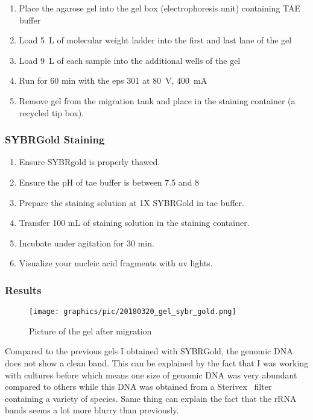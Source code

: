 \begin{enumerate}
\item Place the agarose gel into the gel box (electrophoresis unit) containing TAE buffer
\item Load 5~\textmu L of molecular weight ladder into the first and last lane of the gel
\item Load 9~\textmu L of each sample into the additional wells of the gel
\item Run for 60 min with the \gls{eps} 301 at 80~V, 400~mA
\item Remove gel from the migration tank and place in the staining container (a recycled tip box).
\end{enumerate}

\subsubsection{SYBR\cR Gold Staining}

\begin{enumerate}
\item Ensure SYBR\cR gold is properly thawed.
\item Ensure the pH of \gls{tae} buffer is between 7.5 and 8
\item Prepare the staining solution at 1X SYBR\cR Gold in \gls{tae} buffer.
\item Transfer 100 mL of staining solution in the staining container.
\item Incubate under agitation for 30 min.
\item Visualize your nucleic acid fragments with \gls{uv} lights.
\end{enumerate}

\subsubsection{Results}

\begin{figure}[H] %
    \centering
    \caption{Picture of the gel after migration}
   \texttt{[image: graphics/pic/20180320\_gel\_sybr\_gold.png]}
\end{figure}

Compared to the previous gels I obtained with SYBR\cR Gold, the genomic DNA does not show a clean band. This can be explained by the fact that I was working with cultures before which means one size of genomic DNA was very abundant compared to others while this DNA was obtained from a Sterivex\texttrademark~ filter containing a variety of species. Same thing can explain the fact that the rRNA bands seems a lot more blurry than previously. 

